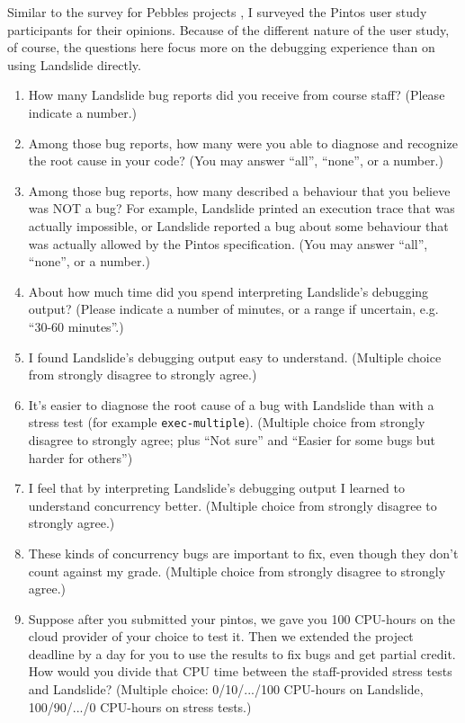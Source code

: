 Similar to the survey for Pebbles projects
\sect{\ref{sec:education-survey-pebbles}},
I surveyed the Pintos user study participants for their opinions.
Because of the different nature of the user study, of course,
the questions here focus more on the debugging experience than on using Landslide directly.

\begin{enumerate}
	\item How many Landslide bug reports did you receive from course staff? (Please indicate a number.)
	\item Among those bug reports, how many were you able to diagnose and recognize the root cause in your code? (You may answer ``all'', ``none'', or a number.)
	\item Among those bug reports, how many described a behaviour that you believe was NOT a bug? For example, Landslide printed an execution trace that was actually impossible, or Landslide reported a bug about some behaviour that was actually allowed by the Pintos specification. (You may answer ``all'', ``none'', or a number.)
	\item About how much time did you spend interpreting Landslide's debugging output? (Please indicate a number of minutes, or a range if uncertain, e.g. ``30-60 minutes''.)
	\item I found Landslide's debugging output easy to understand.
		(Multiple choice from strongly disagree to strongly agree.)
	\item It's easier to diagnose the root cause of a bug with Landslide than with a stress test (for example {\tt exec-multiple}).
		(Multiple choice from strongly disagree to strongly agree; plus ``Not sure'' and ``Easier for some bugs but harder for others'')
	\item I feel that by interpreting Landslide's debugging output I learned to understand concurrency better.
		(Multiple choice from strongly disagree to strongly agree.)
	\item These kinds of concurrency bugs are important to fix, even though they don't count against my grade.
		(Multiple choice from strongly disagree to strongly agree.)
	\item Suppose after you submitted your pintos, we gave you 100 CPU-hours on the cloud provider of your choice to test it. Then we extended the project deadline by a day for you to use the results to fix bugs and get partial credit. How would you divide that CPU time between the staff-provided stress tests and Landslide?
		(Multiple choice: 0/10/.../100 CPU-hours on Landslide, 100/90/.../0 CPU-hours on stress tests.)

\end{enumerate}
